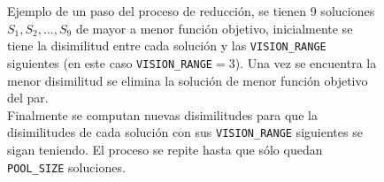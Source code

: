 \begin{figure}
\caption{Ejemplo de un paso del proceso de reducción, se tienen 9 soluciones $S_1,S_2,...,S_9$ de mayor a menor función objetivo, inicialmente se tiene la disimilitud entre cada solución y las \texttt{VISION\_RANGE} siguientes (en este caso \texttt{VISION\_RANGE}$=3$). Una vez se encuentra la menor disimilitud se elimina la solución de menor función objetivo del par.\\ Finalmente se computan nuevas disimilitudes para que la disimilitudes de cada solución con sus \texttt{VISION\_RANGE} siguientes se sigan teniendo. El proceso se repite hasta que sólo quedan \texttt{POOL\_SIZE} soluciones.}
\label{fig:reduction}
\end{figure}
